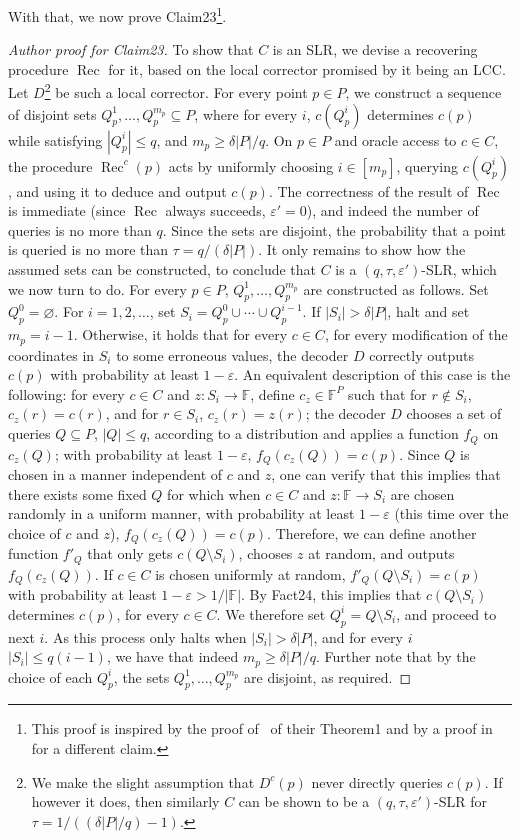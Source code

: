 \documentclass[10pt,a4paper]{article}
\begin{document}
With that, we now prove Claim23\footnote{This proof is inspired by the proof of~\cite{ref23} of their Theorem1 and by a proof in~\cite{ref41} for a different claim.}.
\begin{proof}[Author proof for Claim23]
To show that $C$ is an SLR, we devise a recovering procedure $\operatorname{Rec}$ for it, based on the local corrector promised by it being an LCC. Let $D$\footnote{We make the slight assumption that $D^c(p)$ never directly queries $c(p)$. If however it does, then similarly $C$ can be shown to be a $(q,\tau,\varepsilon')$-SLR for $\tau=1/((\delta|P|/q)-1)$.} be such a local corrector. For every point $p\in P$, we construct a sequence of disjoint sets $Q_p^1,\ldots,Q_p^{m_p}\subseteq P$, where for every $i$, $c(Q_p^i)$ determines $c(p)$ while satisfying $|Q_p^i|\leq q$, and $m_p\geq\delta|P|/q$. On $p\in P$ and oracle access to $c\in C$, the procedure $\operatorname{Rec}^c(p)$ acts by uniformly choosing $i\in[m_p]$, querying $c(Q_p^i)$, and using it to deduce and output $c(p)$. The correctness of the result of $\operatorname{Rec}$ is immediate (since $\operatorname{Rec}$ always succeeds, $\varepsilon'=0$), and indeed the number of queries is no more than $q$. Since the sets are disjoint, the probability that a point is queried is no more than $\tau=q/(\delta|P|)$. It only remains to show how the assumed sets can be constructed, to conclude that $C$ is a $(q,\tau,\varepsilon')$-SLR, which we now turn to do.
For every $p\in P$, $Q_p^1,\ldots,Q_p^{m_p}$ are constructed as follows. Set $Q_p^0=\varnothing$. For $i=1,2,\ldots$, set $S_i=Q_p^0\cup\cdots\cup Q_p^{i-1}$. If $|S_i|>\delta|P|$, halt and set $m_p=i-1$. Otherwise, it holds that for every $c\in C$, for every modification of the coordinates in $S_i$ to some erroneous values, the decoder $D$ correctly outputs $c(p)$ with probability at least $1-\varepsilon$. An equivalent description of this case is the following: for every $c\in C$ and $z:S_i\to\mathbb F$, define $c_z\in\mathbb F^P$ such that for $r\notin S_i$, $c_z(r)=c(r)$, and for $r\in S_i$, $c_z(r)=z(r)$; the decoder $D$ chooses a set of queries $Q\subseteq P$, $|Q|\leq q$, according to a distribution and applies a function $f_Q$ on $c_z(Q)$; with probability at least $1-\varepsilon$, $f_Q(c_z(Q))=c(p)$. Since $Q$ is chosen in a manner independent of $c$ and $z$, one can verify that this implies that there exists some fixed $Q$ for which when $c\in C$ and $z:\mathbb F\to S_i$ are chosen randomly in a uniform manner, with probability at least $1-\varepsilon$ (this time over the choice of $c$ and $z$), $f_Q(c_z(Q))=c(p)$. Therefore, we can define another function $f'_Q$ that only gets $c(Q\setminus S_i)$, chooses $z$ at random, and outputs $f_Q(c_z(Q))$. If $c\in C$ is chosen uniformly at random, $f'_Q(Q\setminus S_i)=c(p)$ with probability at least $1-\varepsilon>1/|\mathbb F|$. By Fact24, this implies that $c(Q\setminus S_i)$ determines $c(p)$, for every $c\in C$. We therefore set $Q_p^i=Q\setminus S_i$, and proceed to next $i$. As this process only halts when $|S_i|>\delta|P|$, and for every $i$ $|S_i|\leq q(i-1)$, we have that indeed $m_p\geq\delta|P|/q$. Further note that by the choice of each $Q_p^i$, the sets $Q_p^1,\ldots,Q_p^{m_p}$ are disjoint, as required.
\end{proof}
\end{document}
